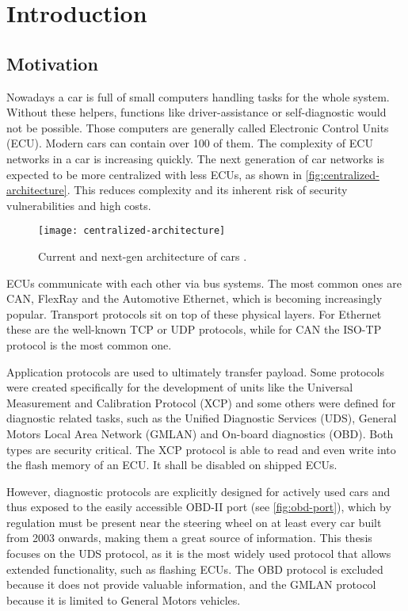 \chapter{Introduction}
\label{sec:introduction}

\section{Motivation}
Nowadays a car is full of small computers handling tasks for the whole system. Without these helpers, functions like driver-assistance or self-diagnostic would not be possible. Those computers are generally called Electronic Control Units (ECU). Modern cars can contain over 100 of them. The complexity of ECU networks in a car is increasing quickly. The next generation of car networks is expected to be more centralized with less ECUs, as shown in \autoref{fig:centralized-architecture}. This reduces complexity and its inherent risk of security vulnerabilities and high costs.

\begin{figure}[htb]
    \centering
    \texttt{[image: centralized-architecture]}
    \caption{Current and next-gen architecture of cars \cite{car-architecture}.}
    \label{fig:centralized-architecture}
\end{figure}

ECUs communicate with each other via bus systems. The most common ones are CAN, FlexRay and the Automotive Ethernet, which is becoming increasingly popular. Transport protocols sit on top of these physical layers. For Ethernet these are the well-known TCP or UDP protocols, while for CAN the ISO-TP protocol is the most common one.

Application protocols are used to ultimately transfer payload. Some protocols were created specifically for the development of units like the Universal Measurement and Calibration Protocol (XCP) and some others were defined for diagnostic related tasks, such as the Unified Diagnostic Services (UDS), General Motors Local Area Network (GMLAN) and On-board diagnostics (OBD). Both types are security critical. The XCP protocol is able to read and even write into the flash memory of an ECU. It shall be disabled on shipped ECUs.

However, diagnostic protocols are explicitly designed for actively used cars and thus exposed to the easily accessible OBD-II port (see \autoref{fig:obd-port}), which by regulation must be present near the steering wheel on at least every car built from 2003 onwards, making them a great source of information. This thesis focuses on the UDS protocol, as it is the most widely used protocol that allows extended functionality, such as flashing ECUs. The OBD protocol is excluded because it does not provide valuable information, and the GMLAN protocol because it is limited to General Motors vehicles.


